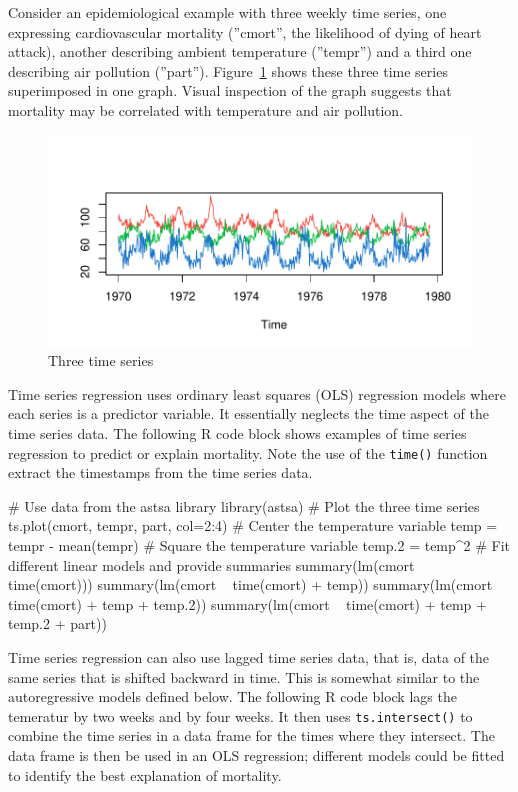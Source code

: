 Consider an epidemiological example with three weekly time series, one expressing cardiovascular mortality (''cmort'', the likelihood of dying of heart attack), another describing ambient temperature (''tempr'') and a third one describing air pollution (''part''). Figure~\ref{fig:figure11} shows these three time series superimposed in one graph. Visual inspection of the graph suggests that mortality may be correlated with temperature and air pollution.

\begin{figure}
\centering
\includegraphics[width=.9\textwidth]{figure11.pdf}
\caption{Three time series}
\label{fig:figure11}
\end{figure}

Time series regression uses ordinary least squares (OLS) regression models where each series is a predictor variable. It essentially neglects the time aspect of the time series data. The following R code block shows examples of time series regression to predict or explain mortality. Note the use of the \texttt{time()} function extract the timestamps from the time series data.

\begin{samepage}
\begin{Rcode}
# Use data from the astsa library
library(astsa)
# Plot the three time series
ts.plot(cmort, tempr, part, col=2:4)
# Center the temperature variable
temp = tempr - mean(tempr)
# Square the temperature variable
temp.2 = temp^2
# Fit different linear models and provide summaries
summary(lm(cmort ~ time(cmort)))
summary(lm(cmort ~ time(cmort) + temp))
summary(lm(cmort ~ time(cmort) + temp + temp.2))
summary(lm(cmort ~ time(cmort) + temp + temp.2 + part))
\end{Rcode}
\end{samepage}

Time series regression can also use lagged time series data, that is, data of the same series that is shifted backward in time. This is somewhat similar to the autoregressive models defined below. The following R code block lags the temeratur by two weeks and by four weeks. It then uses \texttt{ts.intersect()} to combine the time series in a data frame for the times where they intersect. The data frame is then be used in an OLS regression; different models could be fitted to identify the best explanation of mortality.


